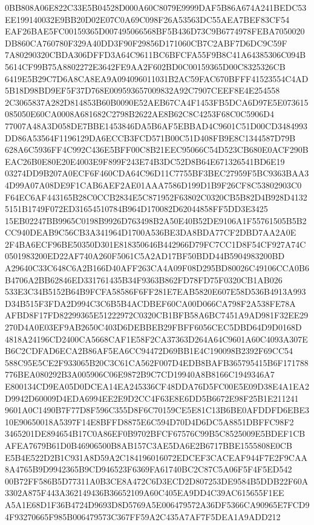 \documentclass[UTF8,fontset=fandol,zihao=-4,a4paper]{ctexart}
\begin{document}
{{0BB808A06E822C33E5B04528D000A60C8079E9999DAF5B86A674A241BEDC53EE199140032E9BB20D02E07C0A69C098F26A53563DC55AEA7BEF83CF54
EAF26BAE5FC00159365D007495066568BF5B436D73C9B6774978FEBA7050020DB860CA760780F329A40DD3F90F29856D171060CB7C2ABF7D6DC9C59F
7A80290320CBDA306DFFD3A64C9611BC6BFCFA55F9B8C41A64385306C094B5614CF99B75A8802272E3642FE9AA2F602BD0C00159365D00C8325326CB
6419E5B29C7D6A8CA8EA9A094096011031B2AC59FAC670BFFF41523554C4AD5B18D98BD9EF5F37D768E009593657009832A92C7907CEEF8E4E254558
2C3065837A282D814853B60B0090E52AEB67CA4F1453FB5DCA6D97E5E073615085050E60CA0008A681682C2798B2622AE8B62C8C4253F68C0C5906D4
77007A48A3D058DE7BBE1453846DA5B6AF5EBBAD4C9601C51D00CD3484993DD86A53564F1196129DA6ECCB3FCD571B00C51D408FB9E8C1344587D79B
628A6C5936FF4C992C436E5BFF00C8B21EEC95066C54D523CB680E0ACF290BEAC26B0E80E20E4003E9F899F243E74B3DC52D8B64E671326541BD6E19
03274DD9B207A0ECF6F460CDA64C96D11C7755BF3BEC27959F5BC9363BAA34D99A07A08DE9F1CAB6AEF2AE01AAA7586D199D1B9F26CF8C53802903C0
F64EC6AF443165B28C0CCB2834E5C871952F63802C0320CB5B82D4B928D41325151B1749F072ED31654510784B964D170082D62044858FF5DD3E3425
15EB02247BB9965C0198B9926D763498B2A50E40B52DE9106A1F55761505B5B2CC940DEAB9C56CB3A341964D1700A536BE3DA8BDA77CF2DBD7AA2A0E
2F4BA6ECF96BE50350D301E818350646B442966D79FC7CC1D8F54CF927A74C0501983200ED22AF740A260F5061C5A2AD17BF50BDD44B5904983200BD
A29640C33C648C6A2B166D40AFF263CA4A09F08D295BD80026C49106CCA0B6B4706A2BB62846ED331761435B34F9363B862FD78FD75F0320CB1AB026
533E3C34B5152B64B9FCFA58586F6FF281E7EAB5820E607E58D536B4913A993D34B515F3FDA2D994C3C6B5B4ACDBEF60CA00D066CA798F2A538FE78A
AFBD8F17FD82299365E51222972C0320CB1BFB58A6BC7451A9AD981F32EE29270D4A0E03EF9AB2650C403D6DEBBEB29FBFF6056CEC5DBD64D9D0168D
4818A24196CD2400CA5668CAF1E58F2CA37363D264A64C9601A60C4093A307EB6C2CDFAD6ECA2B86AF5EA6CC94472D69BB1E4C190098B2392F69CC54
588C95E5CE2F933065B20C3C61CA562F007D4EDB8BAFB365795415B6F171788776BEA080292B3A005906C06E9872B9C7CD19940A8B8166C1949346A7
E800134CD9EA05D0DCEA14EA245336CF48DDA76D5FC00E5E09D38E4A1EA2D9942D60009D4EDA6994EE2E9D2CC4F63E8E6DD5B6672E98F25B1E211241
9601A0C1490B7F77D8F596C355D8F6C70159CE5E81C13B6BE0AFDDFD6EBE310E90650018A5397F14E8BFFD8875E6C594D70D4D6DC5A8851DBFFC98F2
3465201DE894654B17C0A86EF0B9702BFCF67576C99B5C8525009E5BDEF1CBAFEA7679B61D0B46906500B8AB157C3AE5DA6E2B6717BBE1555808E0CB
E5B4E522D2B1C931A8D59A2C184196016072EDCEF3CACEAF944F7E2F9CAA8A4765B9D9942365B9CD946523F6369FA61740BC2C87C5A06F5F4F5ED542
00B72FF586B5D77311A0B3CE8A472C6D3ECD2D807253DE9584B5DDB22F60A3302A875F443A362149436B36652109A60C405EA9DD4C39AC615655F1EE
A5A1E68D1F36B4724D9693D8D5769A5E006479572A36DF5366CA90965E7FCD94F93270665F985B006479573C367FF59A2C435A7AF7F5DEA1A9ADD212
}}
\end{document}
